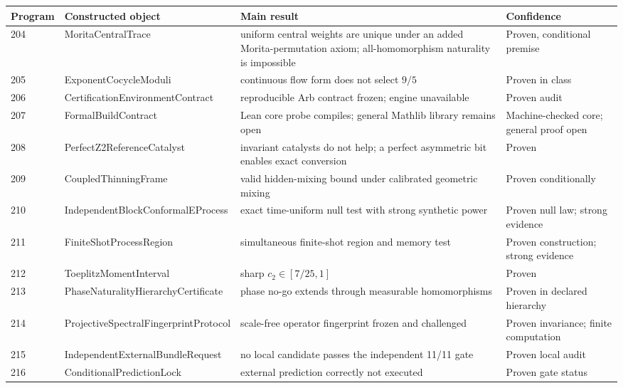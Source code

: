 \documentclass[11pt,a4paper,openany]{report}
\begin{document}
\begin{center}
\begingroup\small
\setlength{\tabcolsep}{3.5pt}
\renewcommand{\arraystretch}{1.16}
\begin{longtable}{@{}p{}p{}p{}p{}@{}}
\toprule
\textbf{Program} & \textbf{Constructed object} & \textbf{Main result} & \textbf{Confidence} \\
\midrule
\endhead
204 & MoritaCentralTrace & uniform central weights are unique under an added Morita-permutation axiom; all-homomorphism naturality is impossible & Proven, conditional premise \\
205 & ExponentCocycleModuli & continuous flow form does not select \(9/5\) & Proven in class \\
206 & CertificationEnvironmentContract & reproducible Arb contract frozen; engine unavailable & Proven audit \\
207 & FormalBuildContract & Lean core probe compiles; general Mathlib library remains open & Machine-checked core; general proof open \\
208 & PerfectZ2ReferenceCatalyst & invariant catalysts do not help; a perfect asymmetric bit enables exact conversion & Proven \\
209 & CoupledThinningFrame & valid hidden-mixing bound under calibrated geometric mixing & Proven conditionally \\
210 & IndependentBlockConformalEProcess & exact time-uniform null test with strong synthetic power & Proven null law; strong evidence \\
211 & FiniteShotProcessRegion & simultaneous finite-shot region and memory test & Proven construction; strong evidence \\
212 & ToeplitzMomentInterval & sharp \(c_2\in[7/25,1]\) & Proven \\
213 & PhaseNaturalityHierarchyCertificate & phase no-go extends through measurable homomorphisms & Proven in declared hierarchy \\
214 & ProjectiveSpectralFingerprintProtocol & scale-free operator fingerprint frozen and challenged & Proven invariance; finite computation \\
215 & IndependentExternalBundleRequest & no local candidate passes the independent 11/\allowbreak{}11 gate & Proven local audit \\
216 & ConditionalPredictionLock & external prediction correctly not executed & Proven gate status \\
\bottomrule
\end{longtable}
\endgroup
\end{center}
\end{document}
